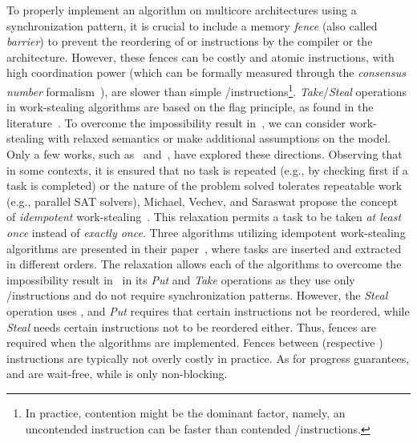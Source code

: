 To properly implement an algorithm on multicore architectures using a synchronization pattern, it is crucial to include a memory \emph{fence} (also called \emph{barrier}) to prevent the reordering of \R or \W instructions by the compiler or the architecture. However, these fences can be costly and atomic \RMW instructions, with high coordination power (which can be formally measured through the \emph{consensus number} formalism~\cite{DBLP_journals_toplas_Herlihy91}), are slower than simple \R/\W instructions\footnote{In practice, contention might be the dominant factor, namely, an uncontended \RMW instruction can be faster than contended \R/\W instructions.}. \emph{Take}/\emph{Steal} operations in work-stealing algorithms are based on the flag principle, as found in the literature~\cite{circular.work.stealing, DBLP_conf_pldi_FrigoLR98, non.blocking.work.stealing, 10.1145.571825.571876}. To overcome the impossibility result in~\cite{DBLP_conf_popl_AttiyaGHKMV11}, we can consider work-stealing with relaxed semantics or make additional assumptions on the model. Only a few works, such as~\cite{maged.vechev.2009} and~\cite{fencefreework}, have explored these directions. Observing that in some contexts, it is ensured that no task is repeated (e.g., by checking first if a task is completed) or the nature of the problem solved tolerates repeatable work (e.g., parallel SAT solvers), Michael, Vechev, and Saraswat propose the concept of \emph{idempotent} work-stealing~\cite{maged.vechev.2009}. This relaxation permits a task to be taken \emph{at least once} instead of \emph{exactly once}. Three algorithms utilizing idempotent work-stealing algorithms are presented in their paper~\cite{maged.vechev.2009},  where tasks are inserted and extracted in different orders. The relaxation allows each of the algorithms to overcome the impossibility result in~\cite{DBLP_conf_popl_AttiyaGHKMV11} in its \emph{Put} and \emph{Take} operations as they use only \R/\W instructions and do not require \RAW synchronization patterns. However, the \emph{Steal} operation uses \CAS, and \emph{Put} requires that certain \W instructions not be reordered, while \emph{Steal} needs certain \R instructions not to be reordered either. Thus, fences are required when the algorithms are implemented. Fences between \R (respective \W) instructions are typically not overly costly in practice. As for progress guarantees, \Put and \Take are wait-free, while \Steal is only non-blocking.

